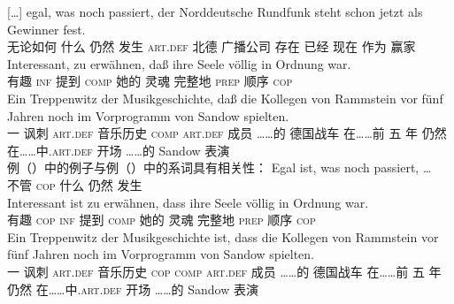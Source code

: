{}[\ldots]
\gll egal,      was  noch  passiert, der Norddeutsche Rundfunk             steht  schon   jetzt als Gewinner fest.\footnotemark\\
     无论如何 什么 仍然 发生 \textsc{art}.\textsc{def} 北德 广播公司 存在 已经 现在 作为 赢家 \particle\\
\ex 
\gll Interessant, zu erwähnen, daß ihre Seele völlig    in Ordnung war.\footnotemark\\
	 有趣 \textsc{inf} 提到 \textsc{comp} 她的 灵魂 完整地 \textsc{prep} 顺序 \textsc{cop}\\
\ex
\gll Ein Treppenwitz der    Musikgeschichte, daß die Kollegen   von Rammstein vor    fünf Jahren noch im      Vorprogramm   von Sandow spielten.\footnotemark\\
	 一 讽刺 \textsc{art}.\textsc{def} 音乐历史 \textsc{comp} \textsc{art}.\textsc{def} 成员 ……的 德国战车 在……前 五 年 仍然 在……中.\textsc{art}.\textsc{def} 开场 ……的 Sandow 表演\\
\zl
例（）中的例子与例（）中的系词具有相关性：
\eal
\ex 
\gll Egal ist, was noch passiert, \ldots\\
     不管 \textsc{cop}	 什么 仍然 发生 \\
\ex
\gll Interessant ist zu erwähnen, dass ihre Seele völlig in Ordnung war.\\
	 有趣 \textsc{cop} \textsc{inf} 提到 \textsc{comp} 她的 灵魂 完整地 \textsc{prep} 顺序 \textsc{cop}\\
\ex %
\gll Ein Treppenwitz der Musikgeschichte ist, dass die Kollegen von Rammstein vor fünf Jahren noch im Vorprogramm von Sandow spielten.\hspace{-5pt}\\
	 一 讽刺 \textsc{art}.\textsc{def} 音乐历史 \textsc{cop} \textsc{comp} \textsc{art}.\textsc{def} 成员 ……的 德国战车 在……前 五 年 仍然 在……中.\textsc{art}.\textsc{def} 开场 ……的 Sandow 表演\\
\zl

